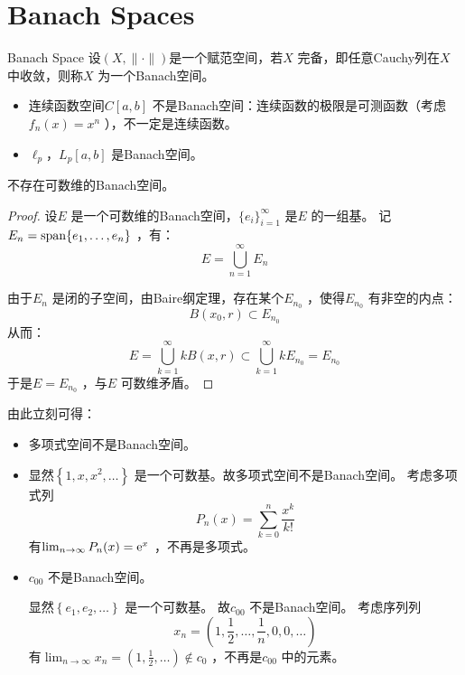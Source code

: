 \section{Banach Spaces}

\begin{definition}{Banach Space}
    设\((X,\|\cdot\|)\)是一个赋范空间，若\(X\) 完备，即任意Cauchy列在\(X\) 中收敛，则称\(X\)
    为一个Banach空间。
\end{definition}

\begin{example}{}
    \begin{itemize}
        \item 连续函数空间\(C[a,b]\) 不是Banach空间：连续函数的极限是可测函数（考虑\(f_{n}(x) =
            x^{n}\) ），不一定是连续函数。
        \item \(\ell_{p}\)，\(L_{p}[a,b]\) 是Banach空间。
    \end{itemize}
\end{example}

\begin{theorem}{}
    不存在可数维的Banach空间。
\end{theorem}

\begin{proof}
    设\(E\) 是一个可数维的Banach空间，\(\{e_{i}\}_{i=1}^{\infty}\) 是\(E\) 的一组基。
    记\(E_{n} = \operatorname{span}\{e_{1},\ldots,e_{n}\}\) ，有：\[
        E = \bigcup_{n=1}^{\infty} E_{n}
    \]

    由于\(E_{n}\) 是闭的子空间，由Baire纲定理，存在某个\(E_{n_{0}}\) ，使得\(E_{n_{0}}\) 有非空的内点：
    \[
        B(x_{0},r) \subset E_{n_{0}}
    \]
    从而：\[
        E = \bigcup_{k=1}^{\infty} k B(x,r) \subset
        \bigcup_{k=1}^{\infty} kE_{n_{0}} = E_{n_{0}}
    \]
    于是\(E = E_{n_{0}}\) ，与\(E\) 可数维矛盾。
\end{proof}

由此立刻可得：
\begin{example}{}
    \begin{itemize}
        \item 多项式空间不是Banach空间。
        \item
            显然\(\left\{ 1, x, x^{2}, \ldots \right\}\) 是一个可数基。故多项式空间不是Banach空间。
            考虑多项式列\[
                P_{n}(x) = \sum_{k=0}^{n} \frac{x^{k}}{k!}
            \]
            有\(\lim_{n \to \infty} P_{n}(x) = \mathrm{e}^{x}\) ，不再是多项式。

        \item \(c_{00}\) 不是Banach空间。

            显然\(\left\{ e_{1}, e_{2}, \ldots \right\}\) 是一个可数基。
            故\(c_{00}\) 不是Banach空间。
            考虑序列列\[
                x_{n} = \left(1, \frac{1}{2}, \ldots, \frac{1}{n}, 0,
                0, \ldots \right)
            \]
            有\(\lim_{n \to \infty} x_{n} = \left( 1, \frac{1}{2},
            \ldots  \right) \notin c_{0}\) ，不再是\(c_{00}\) 中的元素。
    \end{itemize}
\end{example}

